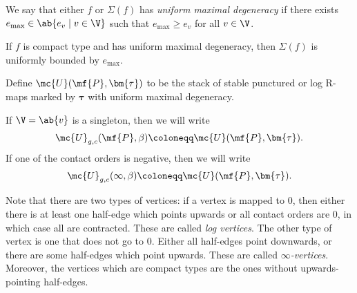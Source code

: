 \begin{defn}
    We say that either \(f\)  or \(\Sigma(f)\) has \textit{uniform maximal degeneracy} if there exists \(e_{\max} \in \ab\{e_v \mid v \in \V \}\) such that \(e_{\max} \geq e_v\) for all \(v \in \V\).
\end{defn}

\begin{rmk}
    If \(f\) is compact type and has uniform maximal degeneracy, then \(\Sigma(f)\) is uniformly bounded by \(e_{\max}\).
\end{rmk}

\begin{defn}
    Define \(\mc{U}(\mf{P}, \bm{\tau})\) to be the stack of stable punctured or log R-maps marked by \(\bm{\tau}\) with uniform maximal degeneracy.
\end{defn}

\begin{rmk}
    If \(\V = \ab\{v\}\) is a singleton, then we will write
    \[ \mc{U}_{g, c}(\mf{P}, \beta) \coloneqq \mc{U}(\mf{P}, \bm{\tau}). \]
    If one of the contact orders is negative, then we will write
    \[ \mc{U}_{g, c}(\infty, \beta) \coloneqq \mc{U}(\mf{P}, \bm{\tau}). \]
\end{rmk}

Note that there are two types of vertices: if a vertex is mapped to \(0\), then either there is at least one half-edge which points upwards or all contact orders are \(0\), in which case all are contracted. These are called \textit{log vertices}. The other type of vertex is one that does not go to \(0\). Either all half-edges point downwards, or there are some half-edges which point upwards. These are called \textit{\(\infty\)-vertices}. Moreover, the vertices which are compact types are the ones without upwards-pointing half-edges.

